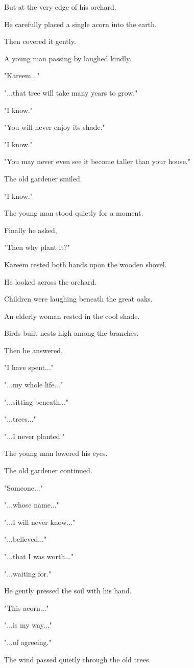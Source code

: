 \documentclass[12pt,openany]{book}
\begin{document}
But at the very edge of his orchard.

He carefully placed a single acorn into the earth.

Then covered it gently.

A young man passing by laughed kindly.

"Kareem..."

"...that tree will take many years to grow."

"I know."

"You will never enjoy its shade."

"I know."

"You may never even see it become taller than your house."

The old gardener smiled.

"I know."

The young man stood quietly for a moment.

Finally he asked,

"Then why plant it?"

Kareem rested both hands upon the wooden shovel.

He looked across the orchard.

Children were laughing beneath the great oaks.

An elderly woman rested in the cool shade.

Birds built nests high among the branches.

Then he answered,

"I have spent..."

"...my whole life..."

"...sitting beneath..."

"...trees..."

"...I never planted."

The young man lowered his eyes.

The old gardener continued.

"Someone..."

"...whose name..."

"...I will never know..."

"...believed..."

"...that I was worth..."

"...waiting for."

He gently pressed the soil with his hand.

"This acorn..."

"...is my way..."

"...of agreeing."

The wind passed quietly through the old trees.
\end{document}
